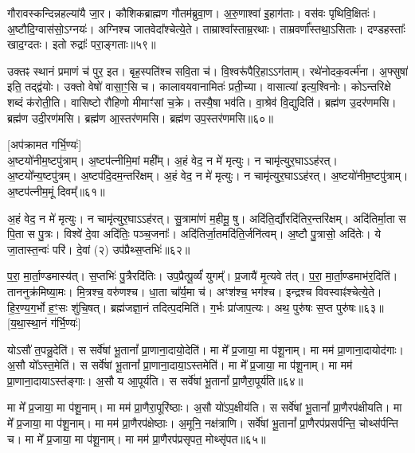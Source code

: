 गौरावस्कन्दिन्नहल्या॑यै जा॒र। कौशिकब्राह्मण गौतम॑ब्रुवा॒ण। 
अ॒रु॒णाश्वा॑ इ॒हाग॑ताः। वस॑वः पृथिवि॒क्षितः॑। 
अ॒ष्टौदि॒ग्वास॑सो॒\-ऽग्नयः॑। अग्निश्च जातवेदा᳚श्चेत्ये॒ते। 
ताम्राश्वा᳚स्ताम्र॒रथाः। ताम्रवर्णा᳚स्तथा॒\-ऽसिताः। 
दण्डहस्ताः᳚ खाद॒ग्दतः। इतो रुद्राः᳚ परा॒ङ्गताः॥५९॥


उक्तꣴ स्थानं प्रमाणं च॑ पुर॒ इत। बृह॒स्पति॑श्च सवि॒ता च॑। 
वि॒श्वरू॑पैरि॒हाऽऽग॑ताम्। रथे॑नोदक॒वर्त्म॑ना। 
अ॒फ्सुषा॑ इति॒ तद्द्व॑योः। उक्तो वेषो॑ वासा॒ꣳ॒सि च। 
कालावयवानामितः॑ प्रती॒च्या। वासात्या॑ इत्य॒श्विनोः। 
कोऽन्तरिक्षे शब्दं क॑रोती॒ति। वासिष्टो रौहिणो मीमाꣳ॑सां च॒क्रे। 
तस्यै॒षा भव॑ति। वा॒श्रेव॑ वि॒द्युदिति॑। 
ब्रह्म॑ण उ॒दर॑णमसि। ब्रह्म॑ण उदी॒रण॑मसि। 
ब्रह्म॑ण आ॒स्तर॑णमसि। ब्रह्म॑ण उप॒स्तर॑णमसि॥६०॥\anuvakamend


[अप॑क्रामत गर्भि॒ण्यः॑]\\
अ॒ष्टयो॑नीम॒ष्टपु॑त्राम्। अ॒ष्टप॑त्नीमि॒मां मही᳚म्। 
अ॒हं वेद॒ न मे॑ मृत्युः। न चामृ॑त्युर॒घाऽऽह॑रत्। 
अ॒ष्टयो᳚न्य॒ष्टपु॑त्रम्। अ॒ष्टप॑दि॒दम॒न्तरि॑क्षम्। 
अ॒हं वेद॒ न मे॑ मृत्युः। न चामृ॑त्युर॒घाऽऽह॑रत्। 
अ॒ष्टयो॑नीम॒ष्टपु॑त्राम्। अ॒ष्टप॑त्नीम॒मूं दिवम्‌᳚॥६१॥


अ॒हं वेद॒ न मे॑ मृत्युः। न चामृ॑त्युर॒घाऽऽह॑रत्। 
सु॒त्रामा॑णं म॒हीमू॒ षु। अदि॑ति॒र्द्यौरदि॑तिर॒न्तरि॑क्षम्। 
अदि॑तिर्मा॒ता स पि॒ता स पु॒त्रः। विश्वे॑ दे॒वा अदि॑तिः॒ पञ्च॒जनाः᳚। 
अदि॑तिर्जा॒तमदि॑ति॒र्जनि॑त्वम्। अ॒ष्टौ पु॒त्रासो॒ अदि॑तेः। 
ये जा॒तास्त॒न्वः॑ परि॑। दे॒वां (२) उप॑प्रैथ्स॒प्तभिः॑॥६२॥


प॒रा॒ मा॒र्ता॒ण्डमास्य॑त्। स॒प्तभिः॑ पु॒त्रैरदि॑तिः। 
उप॒प्रैत्पू॒र्व्यं॑ युगम्᳚। प्र॒जायै॑ मृ॒त्यवे त॑त्। 
प॒रा॒ मा॒र्ता॒ण्डमाभ॑र॒दिति॑। ताननुक्र॑मिष्या॒मः। 
मि॒त्रश्च॒ वरु॑णश्च। धा॒ता चा᳚र्य॒मा च॑। 
अꣳश॑श्च॒ भग॑श्च। इन्द्रश्च विवस्वाꣴ॑श्चेत्ये॒ते। 
हि॒र॒ण्य॒ग॒र्भो ह॒ꣳ॒सः शु॑चि॒षत्। 
ब्रह्म॑जज्ञा॒नं तदित्प॒दमिति॑। ग॒र्भः प्रा॑जाप॒त्यः। 
अथ॒ पुरु॑षः स॒प्त पुरु॑षः॥६३॥\\\mbox{}
[य॒था॒स्था॒नं ग॑र्भि॒ण्यः॑]\anuvakamend

योऽसौ॑ त॒पन्नु॒देति॑। स सर्वे॑षां भू॒तानां᳚ प्रा॒णाना॒दायो॒देति॑। 
मा मे᳚ प्र॒जाया॒ मा प॑शू॒नाम्। मा मम॑ प्रा॒णाना॒दायोद॑गाः। 
अ॒सौ यो᳚ऽस्त॒मेति॑। स सर्वे॑षां भू॒तानां᳚ प्रा॒णाना॒दाया॒ऽस्तमेति॑। 
मा मे᳚ प्र॒जाया॒ मा प॑शू॒नाम्। मा मम॑ प्रा॒णाना॒दायाऽस्त॑ङ्गाः। 
अ॒सौ य आ॒पूर्य॑ति। स सर्वे॑षां भू॒तानां᳚ प्रा॒णैरा॒पूर्य॑ति॥६४॥


मा मे᳚ प्र॒जाया॒ मा प॑शू॒नाम्। मा मम॑ प्रा॒णैरा॒पूरि॑ष्ठाः। 
अ॒सौ यो॑ऽप॒क्षीय॑ति। स सर्वे॑षां भू॒तानां᳚ प्रा॒णैरप॑क्षीयति। 
मा मे᳚ प्र॒जाया॒ मा प॑शू॒नाम्। मा मम॑ प्रा॒णैरप॑क्षेष्ठाः। 
अ॒मूनि॒ नक्ष॑त्राणि। सर्वे॑षां भू॒तानां᳚ प्रा॒णैरप॑प्रसर्पन्ति॒ चोथ्स॑र्पन्ति च। 
मा मे᳚ प्र॒जाया॒ मा प॑शू॒नाम्। मा मम॑ प्रा॒णैरप॑प्रसृपत॒ मोथ्सृ॑पत॥६५॥


